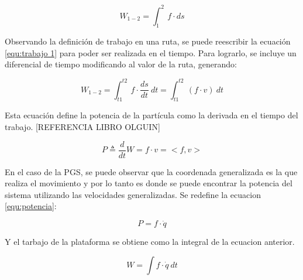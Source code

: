 \begin{equation}\label{equ:trabajo 1}
W_{1-2} = \int_1^2 \ f \cdot ds
\end{equation}

Observando la definición de trabajo en una ruta, se puede reescribir la ecuación \ref{equ:trabajo 1} para poder ser realizada en el tiempo. Para lograrlo, se incluye un diferencial de tiempo modificando al valor de la ruta, generando:

\begin{equation}\label{equ:trabajo}
W_{1-2} = \int_{t1}^{t2} \ f \cdot \frac{ds}{dt} \ dt = \int_{t1}^{t2} \ (f \cdot v) \ dt
\end{equation}

Esta ecuación define la potencia de la partícula como la derivada en el tiempo del trabajo.
[REFERENCIA LIBRO OLGUIN]

\begin{equation} \label{equ:potencia}
P \triangleq \frac{d}{dt}W = f \cdot v = <f,v>
\end{equation}

En el caso de la PGS, se puede observar que la coordenada generalizada es la que realiza el movimiento y por lo tanto es donde se puede encontrar la potencia del sistema utilizando las velocidades generalizadas. Se redefine la ecuacion \ref{equ:potencia}:

\begin{equation}
P = f \cdot \dot{q}
\end{equation}

Y el tarbajo de la plataforma se obtiene como la integral de la ecuacion anterior.

\begin{equation}\label{equ:trabajo-plat}
W = \int f \cdot \dot{q}\ dt
\end{equation}
